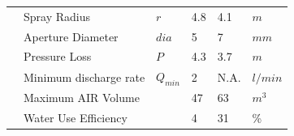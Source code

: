 \documentclass[tc, manuscript]{copernicus}
\begin{document}
\begin{table}
\begin{tabular}{@{}|llllll|@{}}
                           & Spray Radius                    &  $r$            & 4.8           & 4.1           & $m$ \\
		\multicolumn{1}{|l|}{} & Aperture Diameter               &  $dia$          & 5             & 7             & $mm$ \\
		\multicolumn{1}{|l|}{} & Pressure Loss                   &  $P$            & 4.3           & 3.7           & $m$ \\
		\multicolumn{1}{|l|}{} & Minimum discharge rate          &  $Q_{min}$      & 2           & N.A.          & $l/min$ \\\midrule
		\multicolumn{1}{|l|}{\multirow{2}{*}{\rotatebox[origin=c]{90}{AIR}}}

		                       & Maximum AIR Volume              &                 & 47            & 63            & $m^{3}$ \\
		\multicolumn{1}{|l|}{} & Water Use Efficiency            &                 & 4             & 31            & \% \\\midrule
	\end{tabular}
\end{table}
\clearpage


\noappendix 



\end{document}
